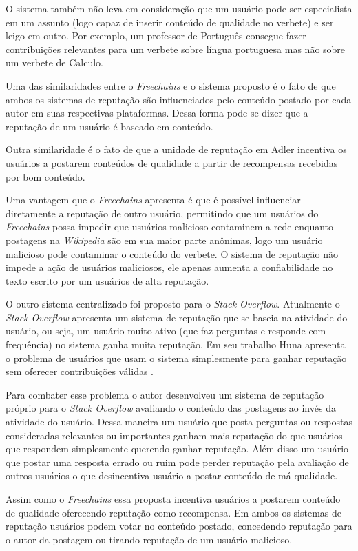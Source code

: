 \documentclass[12pt]{article}
\newcommand{\FC} {\emph{Freechains}\xspace}
\begin{document}
O sistema também não leva em consideração que um usuário pode ser especialista em um assunto (logo capaz de inserir conteúdo de qualidade no verbete) e ser leigo em outro. 
Por exemplo, um professor de Português consegue fazer contribuições relevantes para um verbete sobre língua portuguesa mas não sobre um verbete de Calculo. 

Uma das similaridades entre o \FC e o sistema proposto é o fato de que ambos os sistemas de reputação são influenciados pelo conteúdo postado por cada autor em suas respectivas plataformas. 
Dessa forma pode-se dizer que a reputação de um usuário é baseado em conteúdo.

Outra similaridade é o fato de que a unidade de reputação em Adler incentiva os usuários a postarem conteúdos de qualidade a partir de recompensas recebidas por bom conteúdo.

Uma vantagem que o \FC apresenta é que é possível influenciar diretamente a reputação de outro usuário, permitindo que um usuários do \FC possa impedir que usuários malicioso contaminem a rede enquanto postagens na \emph{Wikipedia} são em sua maior parte anônimas, logo um usuário malicioso pode contaminar o conteúdo do verbete. 
O sistema de reputação não impede a ação de usuários maliciosos, ele apenas aumenta a confiabilidade no texto escrito por um usuários de alta reputação.

O outro sistema centralizado foi proposto para o \emph{Stack Overflow}. 
Atualmente o \emph{Stack Overflow} apresenta um sistema de reputação que se baseia na atividade do usuário, ou seja, um usuário muito ativo (que faz perguntas e responde com frequência) no sistema ganha muita reputação. 
Em seu trabalho Huna apresenta o problema de usuários que usam o sistema simplesmente para ganhar reputação sem oferecer contribuições válidas \cite{huna2016exploiting}.

Para combater esse problema o autor desenvolveu um sistema de reputação próprio para o \emph{Stack Overflow} avaliando o conteúdo das postagens ao invés da atividade do usuário. 
Dessa maneira um usuário que posta perguntas ou respostas consideradas relevantes ou importantes ganham mais reputação do que usuários que respondem simplesmente querendo ganhar reputação. 
Além disso um usuário que postar uma resposta errado ou ruim pode perder reputação pela avaliação de outros usuários o que desincentiva usuário a postar conteúdo de má qualidade. 

Assim como o \FC essa proposta incentiva usuários a postarem conteúdo de qualidade oferecendo reputação como recompensa. 
Em ambos os sistemas de reputação usuários podem votar no conteúdo postado, concedendo reputação para o autor da postagem ou tirando reputação de um usuário malicioso. 
\end{document}
